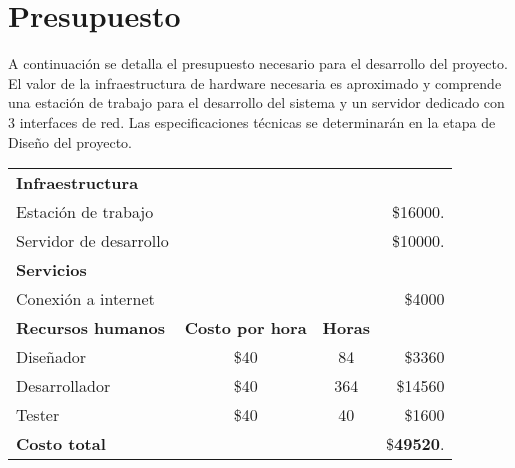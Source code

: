 \newpage

\section*{Presupuesto}

A continuación se detalla el presupuesto necesario para el desarrollo del proyecto. El valor de la infraestructura de hardware necesaria es aproximado y comprende una estación de trabajo para el desarrollo del sistema y un servidor dedicado con 3 interfaces de red. Las especificaciones técnicas se determinarán en la etapa de Diseño del proyecto.

\vspace{12px}

\begin{centering}

\begin{tabular}{l c c r}
\textbf{Infraestructura} & & & \\
Estación de trabajo & & & \$16000. \\
Servidor de desarrollo & & & \$10000. \\
\hline
\textbf{Servicios} & & &\\
Conexión a internet & & & \$4000 \\
\hline
\textbf{Recursos humanos} & \textbf{Costo por hora} & \textbf{Horas} \\
Diseñador & \$40 & 84 & \$3360 \\
Desarrollador & \$40 & 364 & \$14560 \\
Tester & \$40 & 40 & \$1600 \\
\hline
\textbf{Costo total} & & & \$\textbf{49520}.
\end{tabular}
\end{centering}



